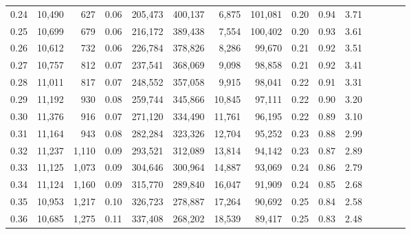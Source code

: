 \begin{tabular}{rrrcrrrrrrrrrrr}
0.24 &  10,490 &    627 &                                       0.06 &  205,473 &  400,137 &    6,875 &  101,081 &  0.20 &  0.94 &                         3.71 \\
0.25 &  10,699 &    679 &                                       0.06 &  216,172 &  389,438 &    7,554 &  100,402 &  0.20 &  0.93 &                         3.61 \\
0.26 &  10,612 &    732 &                                       0.06 &  226,784 &  378,826 &    8,286 &   99,670 &  0.21 &  0.92 &                         3.51 \\
0.27 &  10,757 &    812 &                                       0.07 &  237,541 &  368,069 &    9,098 &   98,858 &  0.21 &  0.92 &                         3.41 \\
0.28 &  11,011 &    817 &                                       0.07 &  248,552 &  357,058 &    9,915 &   98,041 &  0.22 &  0.91 &                         3.31 \\
0.29 &  11,192 &    930 &                                       0.08 &  259,744 &  345,866 &   10,845 &   97,111 &  0.22 &  0.90 &                         3.20 \\
0.30 &  11,376 &    916 &                                       0.07 &  271,120 &  334,490 &   11,761 &   96,195 &  0.22 &  0.89 &                         3.10 \\
0.31 &  11,164 &    943 &                                       0.08 &  282,284 &  323,326 &   12,704 &   95,252 &  0.23 &  0.88 &                         2.99 \\
0.32 &  11,237 &  1,110 &                                       0.09 &  293,521 &  312,089 &   13,814 &   94,142 &  0.23 &  0.87 &                         2.89 \\
0.33 &  11,125 &  1,073 &                                       0.09 &  304,646 &  300,964 &   14,887 &   93,069 &  0.24 &  0.86 &                         2.79 \\
0.34 &  11,124 &  1,160 &                                       0.09 &  315,770 &  289,840 &   16,047 &   91,909 &  0.24 &  0.85 &                         2.68 \\
0.35 &  10,953 &  1,217 &                                       0.10 &  326,723 &  278,887 &   17,264 &   90,692 &  0.25 &  0.84 &                         2.58 \\
0.36 &  10,685 &  1,275 &                                       0.11 &  337,408 &  268,202 &   18,539 &   89,417 &  0.25 &  0.83 &                         2.48 \\

\end{tabular}
